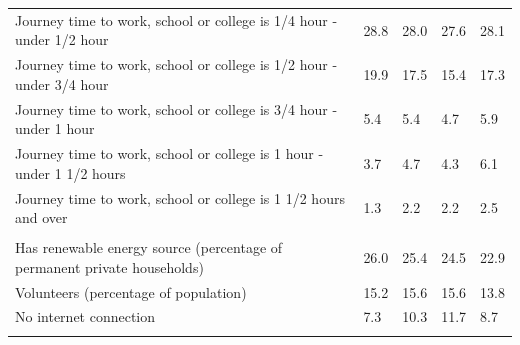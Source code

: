 \documentclass{article}
\begin{document}
\begin{table}[h]
\begin{tabular}{KTTTT}
Journey time to work, school or college is 1/4 hour - under 1/2 hour & 28.8& 28.0& 27.6& 28.1\\
Journey time to work, school or college is 1/2 hour - under 3/4 hour & 19.9& 17.5& 15.4& 17.3\\
Journey time to work, school or college is 3/4 hour - under 1 hour & 5.4& 5.4& 4.7& 5.9\\
Journey time to work, school or college is 1 hour - under 1 1/2 hours & 3.7& 4.7& 4.3& 6.1\\
Journey time to work, school or college is 1 1/2 hours and over & 1.3& 2.2& 2.2& 2.5\\
\hline
    \\ 
    \hline
Has renewable energy source (percentage of permanent private households) & 26.0& 25.4& 24.5& 22.9\\
    \hline
Volunteers (percentage of population) & 15.2& 15.6& 15.6& 13.8\\
    \hline
No internet connection&  7.3& 10.3& 11.7&  8.7\\
\hline
\end{tabular}
\end{table}
\end{document}

